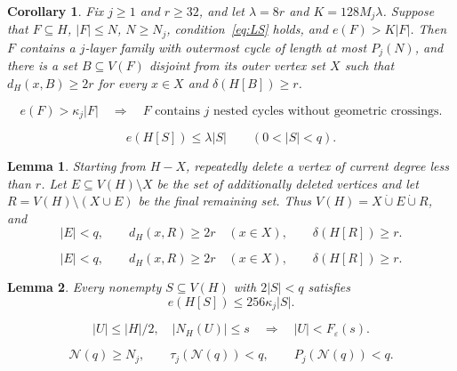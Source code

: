 \documentclass[10pt,a4paper]{amsart}
\newtheorem{corollary}{Corollary}
\newtheorem{lemma}{Lemma}
\newcommand{\dcup}{\mathbin{\dot\cup}}
\newcommand{\eps}{\varepsilon}
\begin{document}
\begin{corollary}\label{cor:reservedlocal}
Fix $j\ge1$ and $r\ge32$, and let $\lambda=8r$ and $K=128M_j\lambda$. Suppose that $F\subseteq H$, $|F|\le N$, $N\ge N_j$, condition~\eqref{eq:LS} holds, and $e(F)>K|F|$. Then $F$ contains a $j$-layer family with outermost cycle of length at most $P_j(N)$, and there is a set $B\subseteq V(F)$ disjoint from its outer vertex set $X$ such that $d_H(x,B)\ge2r$ for every $x\in X$ and $\delta(H[B])\ge r$.
\end{corollary}

\begin{equation}\label{eq:indhyp}
e(F)>\kappa_j|F|
\quad\Longrightarrow\quad
F\text{ contains }j\text{ nested cycles without geometric crossings}.
\end{equation}

\begin{equation}\label{eq:MIN}
e(H[S])\le\lambda|S|\qquad(0<|S|<q).
\end{equation}

\begin{lemma}\label{lem:peelX}
Starting from $H-X$, repeatedly delete a vertex of current degree less than $r$. Let $E\subseteq V(H)\setminus X$ be the set of additionally deleted vertices and let $R=V(H)\setminus(X\cup E)$ be the final remaining set. Thus $V(H)=X\dcup E\dcup R$, and
\begin{equation}\label{eq:CORE}
|E|<q,\qquad
d_H(x,R)\ge2r\quad(x\in X),\qquad
\delta(H[R])\ge r.
\end{equation}
\end{lemma}

\begin{equation}
|E|<q,\qquad
d_H(x,R)\ge2r\quad(x\in X),\qquad
\delta(H[R])\ge r.
\end{equation}

\begin{lemma}\label{lem:smallsets}
Every nonempty $S\subseteq V(H)$ with $2|S|<q$ satisfies
\begin{equation}\label{eq:smallMIN}
e(H[S])\le256\kappa_j|S|.
\end{equation}
\end{lemma}

\begin{equation}\label{eq:INV}
|U|\le|H|/2,\quad |N_H(U)|\le s
\quad\Longrightarrow\quad |U|<F_\eps(s).
\end{equation}

\begin{equation}\label{eq:q0}
\mathcal N(q)\ge N_j,\qquad
\tau_j(\mathcal N(q))<q,\qquad
P_j(\mathcal N(q))<q.
\end{equation}
\end{document}
